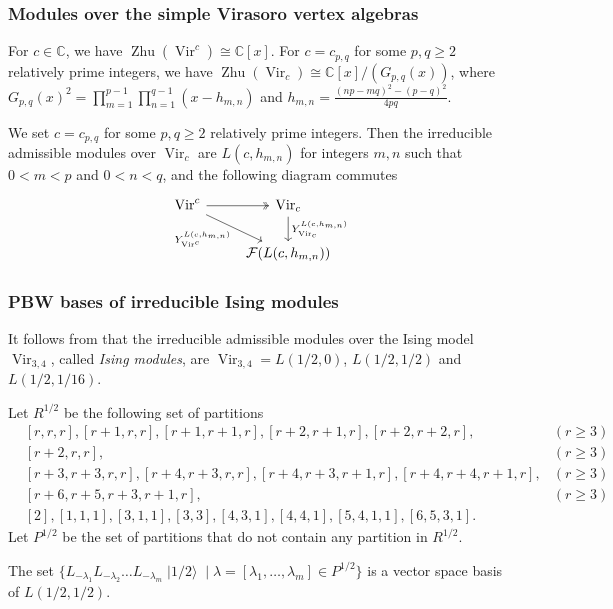 \documentclass{beamer}
\DeclareMathOperator{\Vir}{Vir}
\DeclareMathOperator{\vachalf}{|1/2\rangle}
\DeclareMathOperator{\Zhu}{Zhu}
\begin{document}
\begin{frame}[fragile]
  \frametitle{Modules over the simple Virasoro vertex algebras}
  \begin{example}
    \label{exa:6}
    For $c \in \mathbb{C}$, we have $\Zhu(\Vir^c) \cong \mathbb{C}[x]$.
    For $c = c_{p, q}$ for some $p, q \ge 2$ relatively prime integers, we have $\Zhu(\Vir_c) \cong \mathbb{C}[x]/(G_{p, q}(x))$, where $G_{p ,q}(x)^2 = \prod_{m = 1}^{p - 1}\prod_{n = 1}^{q - 1}(x - h_{m, n})$ and $h_{m, n} = \frac{(np - mq)^2 - (p - q)^2}{4pq}$.
  \end{example}

  \begin{theorem}
    \label{thr:8}
    We set $c = c_{p, q}$ for some $p, q \ge 2$ relatively prime integers.
    Then the irreducible admissible modules over $\Vir_c$ are $L(c, h_{m, n})$ for integers $m, n$ such that $0 < m < p$ and $0 < n < q$, and the following diagram commutes
    \begin{equation*}
      \begin{tikzcd}
        \Vir^c \arrow[r, two heads] \arrow[rd, "{Y^{L(c, h_{m, n})}_{\Vir^c}}"'] & {\Vir_c} \arrow[d, "{Y^{L(c, h_{m, n})}_{\Vir_c}}"] \\
        & {\mathcal{F}(L(c, h_{m, n}))}
      \end{tikzcd}
    \end{equation*}
  \end{theorem}
\end{frame}

\begin{frame}
  \frametitle{PBW bases of irreducible Ising modules}
  It follows from  that the irreducible admissible modules over the Ising model $\Vir_{3, 4}$, called \emph{Ising modules}, are $\Vir_{3, 4} = L(1/2, 0)$, $L(1/2, 1/2)$ and $L(1/2, 1/16)$.

  Let $R^{1/2}$ be the following set of partitions
  \footnotesize
  \begin{align*}
    &[r, r, r], [r + 1, r, r], [r + 1, r + 1, r], [r + 2, r + 1, r], [r + 2, r + 2, r], &(r \ge 3) \\
    &[r + 2, r, r], &(r \ge 3) \\
    &[r + 3, r + 3, r, r], [r + 4, r + 3, r, r],  [r + 4, r + 3, r + 1, r], [r + 4, r + 4, r + 1, r], &(r \ge 3)\\
    &[r + 6, r + 5, r + 3, r + 1, r], &(r \ge 3) \\
    &[2], [1, 1, 1], [3, 1, 1], [3, 3], [4, 3, 1], [4, 4, 1], [5, 4, 1, 1], [6, 5, 3, 1].
  \end{align*}
  \normalsize
  Let $P^{1/2}$ be the set of partitions that do not contain any partition in $R^{1/2}$.

  \begin{theorem}
    \label{thr:9}
    The set $\{L_{-\lambda_1}L_{-\lambda_2}\dots L_{-\lambda_m}\vachalf \mid \lambda = [\lambda_1, \dots, \lambda_m] \in P^{1/2}\}$ is a vector space basis of $L(1/2, 1/2)$.
  \end{theorem}
\end{frame}
\end{document}
